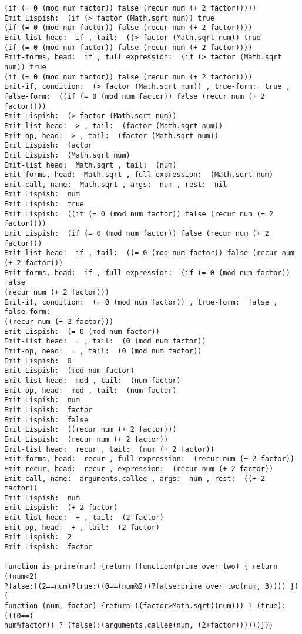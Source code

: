 \begin{verbatim}
(if (= 0 (mod num factor)) false (recur num (+ 2 factor)))))
Emit Lispish:  (if (> factor (Math.sqrt num)) true 
(if (= 0 (mod num factor)) false (recur num (+ 2 factor))))
Emit-list head:  if , tail:  ((> factor (Math.sqrt num)) true 
(if (= 0 (mod num factor)) false (recur num (+ 2 factor))))
Emit-forms, head:  if , full expression:  (if (> factor (Math.sqrt num)) true 
(if (= 0 (mod num factor)) false (recur num (+ 2 factor))))
Emit-if, condition:  (> factor (Math.sqrt num)) , true-form:  true , 
false-form:  ((if (= 0 (mod num factor)) false (recur num (+ 2 factor))))
Emit Lispish:  (> factor (Math.sqrt num))
Emit-list head:  > , tail:  (factor (Math.sqrt num))
Emit-op, head:  > , tail:  (factor (Math.sqrt num))
Emit Lispish:  factor
Emit Lispish:  (Math.sqrt num)
Emit-list head:  Math.sqrt , tail:  (num)
Emit-forms, head:  Math.sqrt , full expression:  (Math.sqrt num)
Emit-call, name:  Math.sqrt , args:  num , rest:  nil
Emit Lispish:  num
Emit Lispish:  true
Emit Lispish:  ((if (= 0 (mod num factor)) false (recur num (+ 2 factor))))
Emit Lispish:  (if (= 0 (mod num factor)) false (recur num (+ 2 factor)))
Emit-list head:  if , tail:  ((= 0 (mod num factor)) false (recur num 
(+ 2 factor)))
Emit-forms, head:  if , full expression:  (if (= 0 (mod num factor)) false 
(recur num (+ 2 factor)))
Emit-if, condition:  (= 0 (mod num factor)) , true-form:  false , false-form:
((recur num (+ 2 factor)))
Emit Lispish:  (= 0 (mod num factor))
Emit-list head:  = , tail:  (0 (mod num factor))
Emit-op, head:  = , tail:  (0 (mod num factor))
Emit Lispish:  0
Emit Lispish:  (mod num factor)
Emit-list head:  mod , tail:  (num factor)
Emit-op, head:  mod , tail:  (num factor)
Emit Lispish:  num
Emit Lispish:  factor
Emit Lispish:  false
Emit Lispish:  ((recur num (+ 2 factor)))
Emit Lispish:  (recur num (+ 2 factor))
Emit-list head:  recur , tail:  (num (+ 2 factor))
Emit-forms, head:  recur , full expression:  (recur num (+ 2 factor))
Emit recur, head:  recur , expression:  (recur num (+ 2 factor))
Emit-call, name:  arguments.callee , args:  num , rest:  ((+ 2 factor))
Emit Lispish:  num
Emit Lispish:  (+ 2 factor)
Emit-list head:  + , tail:  (2 factor)
Emit-op, head:  + , tail:  (2 factor)
Emit Lispish:  2
Emit Lispish:  factor

function is_prime(num) {return (function(prime_over_two) { return ((num<2)
?false:((2==num)?true:((0==(num%2))?false:prime_over_two(num, 3)))) })(
function (num, factor) {return ((factor>Math.sqrt((num))) ? (true):(((0==(
num%factor)) ? (false):(arguments.callee(num, (2+factor))))))})}
\end{verbatim}

